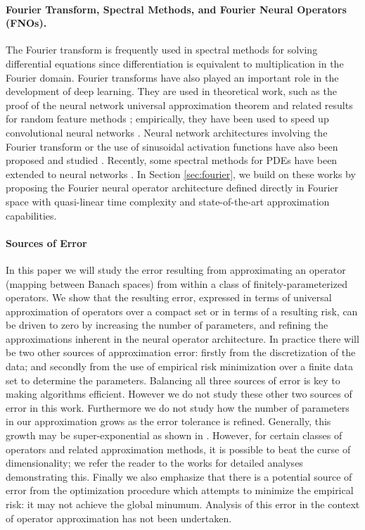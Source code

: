 \paragraph{Fourier Transform, Spectral Methods, and Fourier Neural Operators (FNOs).}
The Fourier transform is frequently used in spectral methods for solving differential equations since differentiation is equivalent to multiplication in the Fourier domain.
Fourier transforms have also played an important role in the development of deep learning. 
They are used in theoretical work, such as the proof of the neural network
universal approximation theorem \citep{hornik1989multilayer} and related
results for random feature methods \citep{rahimi2008uniform}; empirically, they have been used to speed up convolutional neural networks \citep{mathieu2013fast}.
Neural network architectures involving the Fourier transform or the use of sinusoidal activation functions have also been proposed and studied \citep{bengio2007scaling,mingo2004Fourier, sitzmann2020implicit}.
Recently, some spectral methods for PDEs have been extended to neural networks \citep{fan2019bcr, fan2019multiscale, kashinath2020enforcing}. In Section \ref{sec:fourier}, we build on these works by proposing the Fourier neural operator architecture defined directly in Fourier space with quasi-linear time complexity and state-of-the-art approximation capabilities. 

\paragraph{Sources of Error}

In this paper we will study the error resulting from approximating
an operator (mapping between Banach spaces) from within a class of
finitely-parameterized operators. We show that the resulting error,
expressed in terms of universal approximation of operators over
a compact set or in terms of a resulting risk,
can be driven to zero by increasing the number of parameters, and 
refining the approximations inherent in the neural operator architecture.
In practice there will be two other sources of approximation error: firstly from the
discretization of the data; and secondly from the use of empirical
risk minimization over a finite data set to determine the parameters. 
Balancing all three sources of error is key to making algorithms efficient.
However we do not study these other two sources of error in this work. Furthermore we do not study how the number of parameters in our approximation grows as the error tolerance is refined. Generally, this growth may be super-exponential as shown in \citep{kovachki2021universal}. However, for certain classes of operators and related approximation methods, it is possible to beat the curse of dimensionality; 
we refer the reader to the works 
\citep{lanthaler2021error,kovachki2021universal} for detailed analyses
demonstrating this. Finally we also emphasize that there
is a potential source of error from the optimization procedure which attempts to minimize the empirical risk: it may not achieve the global minumum. Analysis of this error
in the context of operator approximation has not been undertaken.
